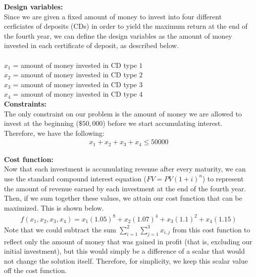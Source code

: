 \documentclass[11pt]{article}
\begin{document}
\begin{prob}{3}
\end{prob}

\begin{sol}

\textbf{Design variables:} \\ 
Since we are given a fixed amount of money to invest into four different cerficiates of deposits (CDs) in order to yield the maximum return at the end of the fourth year, we can define the design variables as the amount of money invested in each certificate of deposit, as described below.\\ \\ 
$x_{1}$ = amount of money invested in CD type $1$ \\
$x_{2}$ = amount of money invested in CD type $2$ \\
$x_{3}$ = amount of money invested in CD type $3$ \\
$x_{4}$ = amount of money invested in CD type $4$ \\

\textbf{Constraints:}  \\
The only constraint on our problem is the amount of money we are allowed to invest at the beginning ($\$50,000$) before we start accumulating interest. Therefore, we have the following:
\begin{eqnarray*}
x_{1} + x_{2} + x_{3} + x_{4} \leq 50000
\end{eqnarray*}

\textbf{Cost function:} \\
Now that each investment is accumulating revenue after every maturity, we can use the standard compound interest equation ($FV = PV(1+i)^{n}$) to represent the amount of revenue earned by each investment at the end of the fourth year. Then, if we sum together these values, we attain our cost function that can be maximized. This is shown below.
\begin{eqnarray*}
f(x_{1}, x_{2}, x_{3}, x_{4}) = x_{1}(1.05)^{8} + x_{2}(1.07)^{4} + x_{3}(1.1)^{2} + x_{4}(1.15)
\end{eqnarray*}
Note that we could subtract the sum $\sum_{i=1}^{2}\sum_{j=1}^{3}x_{i,j}$ from this cost function to reflect only the amount of money that was gained in profit (that is, excluding our initial investment), but this would simply be a difference of a scalar that would not change the solution itself. Therefore, for simplicity, we keep this scalar value off the cost function.


\end{sol}
\end{document}
